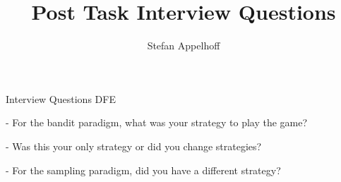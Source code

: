 \documentclass[11pt,a4paper,oneside]{article}
\author{Stefan Appelhoff}
\title{Post Task Interview Questions}
\begin{document}
Interview Questions DFE

- For the bandit paradigm, what was your strategy to play the game?


- Was this your only strategy or did you change strategies?


- For the sampling paradigm, did you have a different strategy?
\end{document}

